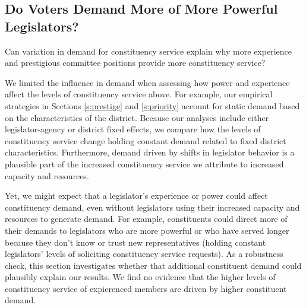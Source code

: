 \documentclass[12pt]{article}
\begin{document}


\subsection{Do Voters Demand More of More Powerful Legislators?}

Can variation in demand for constituency service explain why more experience and prestigious committee positions provide more constituency service? 

We limited the influence in demand when assessing how power and experience affect the levels of constituency service above. For example, our empirical strategies in Sections \ref{s:prestige}%
and \ref{s:priority} account for static demand based on the characteristics of the district. %
Because our analyses include either legislator-agency or district fixed effects, we compare how the levels of constituency service change holding constant demand related to fixed district characteristics. Furthermore, %
demand driven by shifts in legislator behavior is a plausible part of the increased constituency service we attribute to increased capacity and resources.

Yet, we might expect that a legislator's experience or power could affect constituency demand, even without legislators using their increased capacity and resources to generate demand. %
For example, constituents could direct more of their demands to legislators who are more powerful or who have served longer because they don't know or trust new representatives (holding constant legislators' levels of soliciting constituency service requests). As a robustness check, this section investigates whether that additional constituent demand could plausibly explain our results. We find no evidence that the higher levels of constituency service of expierenced members are driven by higher constituent demand. 
\end{document}
